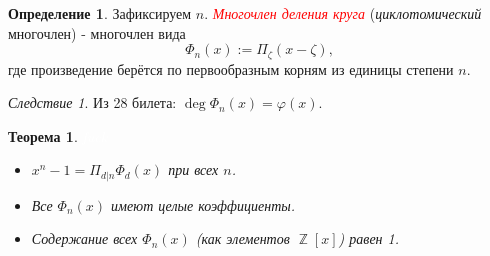 \documentclass[a4paper,100pt]{article}
\theoremstyle{indented}
\newtheorem{theorem}{Теорема}
\theoremstyle{definition}
\newtheorem{defn}{Определение}
\theoremstyle{remark}
\newtheorem{cons}{Следствие}
\DeclareMathOperator{\ZZ}{\mathbb{Z}}
\begin{document}
\begin{defn}
    Зафиксируем $n$. \hypertarget{n93}{\textcolor{red}{\textit{Многочлен деления круга}}} (\textit{циклотомический} многочлен) - многочлен вида 
    \[
        \Phi_n(x):=\Pi_\zeta(x-\zeta), 
    \]
    где произведение берётся по первообразным корням из единицы степени $n$.
\end{defn}

\begin{cons}
    Из 28 билета: $\deg \Phi_n(x)=\varphi(x)$.
\end{cons}

\begin{theorem}
    \textcolor{white}{fuck}\

    \begin{itemize}
        \item $x^n-1=\Pi_{d\vert n}\Phi_d(x)$ при всех $n$.
        \item Все $\Phi_n(x)$ имеют целые коэффициенты.
        \item Содержание всех $\Phi_n(x)$ (как элементов $\ZZ [x]$) равен 1.
    \end{itemize}
\end{theorem}
\end{document}
